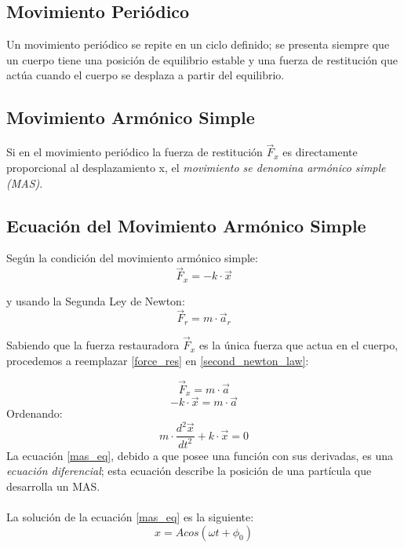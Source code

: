 \documentclass[../main.tex]{subfiles}
\begin{document}
\subsection{Movimiento Periódico}

Un movimiento periódico se repite
en un ciclo definido; se presenta siempre que un cuerpo
tiene una posición de equilibrio estable y una fuerza de
restitución que actúa cuando el cuerpo se desplaza a partir
del equilibrio.  \parencite{sears}

\subsection{Movimiento Armónico Simple}

Si en el movimiento periódico
la fuerza de restitución $\vec{F}_x$ es directamente proporcional al
desplazamiento x, el \textit{movimiento se denomina armónico
simple (MAS)}. \parencite{sears}

\subsection{Ecuación del Movimiento Armónico Simple}

Según la condición del movimiento armónico simple:
\begin{equation} \label{force_res}
    \vec{F}_x = - k\cdot \vec{x}
\end{equation}

y usando la Segunda Ley de Newton:
\begin{equation} \label{second_newton_law}
    \vec{F}_r = m\cdot\vec{a}_r
\end{equation} 

Sabiendo que la fuerza restauradora $\vec{F}_x$ es la única fuerza que actua en el cuerpo,
procedemos a reemplazar \ref{force_res} en \ref{second_newton_law}:

\begin{equation} \nonumber
    \vec{F}_x = m\cdot\vec{a}
\end{equation}
\begin{equation} \nonumber
    - k\cdot \vec{x} = m\cdot\vec{a}
\end{equation}
Ordenando:
\begin{equation} \label{mas_eq}
    m\cdot\frac{d^2\vec{x}}{dt^2} + k\cdot \vec{x} = 0
\end{equation}
La ecuación \ref{mas_eq}, debido a que posee una función con sus derivadas, es una \textit{ecuación
diferencial}; esta ecuación describe la posición de una partícula que desarrolla un MAS.\\ \\
La solución de la ecuación \ref{mas_eq} es la siguiente: 
\begin{equation} \label{mas_general_sol}
    x = Acos(\omega t + \phi_0)
\end{equation}
\end{document}

